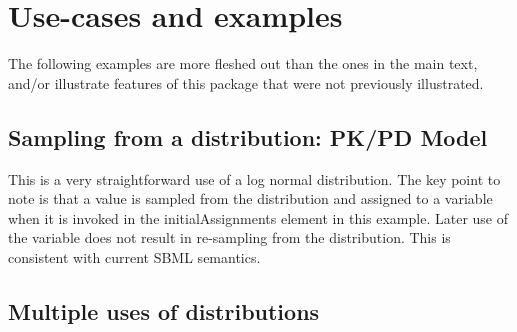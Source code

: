 \documentclass[draftspec]{sbmlpkgspec}
\newcommand{\mathml}{MathML\xspace}
\newcommand{\controversial}{\marginpar{\hspace*{34pt}\raisebox{-0.5ex}{\Large?}}}
\begin{document}
\section{Use-cases and examples}

The following examples are more fleshed out than the ones in the main text, and/or illustrate features of this package that were not previously illustrated.

\subsection{Sampling from a distribution: PK/PD Model}

This is a very straightforward use of a log normal distribution. The key point to note is that a value is sampled from
the distribution and assigned to a variable when it is invoked in the
initialAssignments element in this example. Later use of the variable
does not result in re-sampling from the distribution. This is
consistent with current SBML semantics.








\subsection{Multiple uses of distributions }
\end{document}
